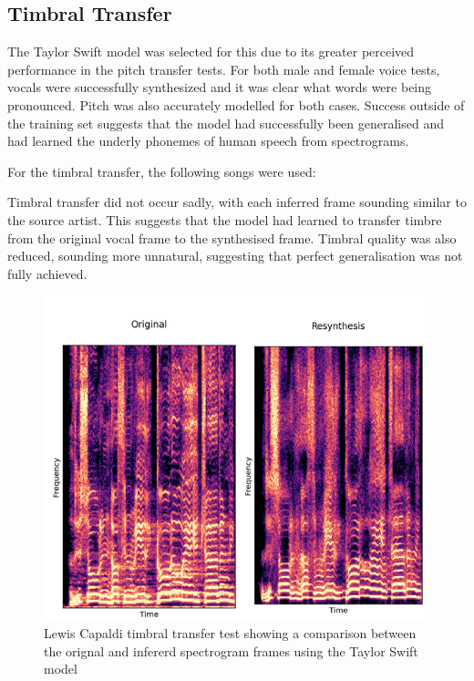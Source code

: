 \subsection{Timbral Transfer}

The Taylor Swift model was selected for this due to its greater perceived performance in the pitch transfer tests. For both male and female voice tests, vocals were successfully synthesized and it was clear what words were being pronounced. Pitch was also accurately modelled for both cases. Success outside of the training set suggests that the model had successfully been generalised and had learned the underly phonemes of human speech from spectrograms.

For the timbral transfer, the following songs were used:

\vspace{0.5cm}
\vspace{0.5cm}

Timbral transfer did not occur sadly, with each inferred frame sounding similar to the source artist. This suggests that the model had learned to transfer timbre from the original vocal frame to the synthesised frame. Timbral quality was also reduced, sounding more unnatural, suggesting that perfect generalisation was not fully achieved. 

\begin{figure}[H]
    \centering
    \includegraphics[width=\textwidth]{research/results/LewisCapaldi/TimbralTransfer.png}
    \caption{Lewis Capaldi timbral transfer test showing a comparison between the orignal and infererd spectrogram frames using the Taylor Swift model}
\end{figure}


